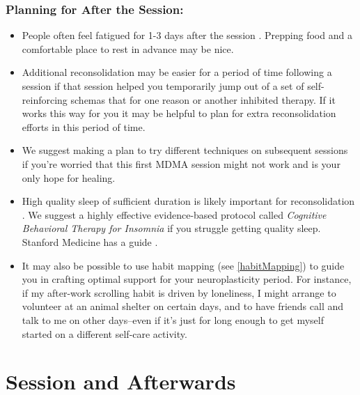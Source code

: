 \documentclass[12pt,letterpaper]{book}
\begin{document}
\subsection*{Planning for After the Session:}
\begin{itemize}
    \item People often feel fatigued for 1-3 days after the session \cite{liechtiGender}. Prepping food and a comfortable place to rest in advance may be nice.
    \item Additional reconsolidation may be easier for a period of time following a session if that session helped you temporarily jump out of a set of self-reinforcing schemas that for one reason or another inhibited therapy. If it works this way for you it may be helpful to plan for extra reconsolidation efforts in this period of time.
    \item We suggest making a plan to try different techniques on subsequent sessions if you're worried that this first MDMA session might not work and is your only hope for healing.
    \item High quality sleep of sufficient duration is likely important for reconsolidation \cite{simon2020sleep}. We suggest a highly effective evidence-based protocol called \textit{Cognitive Behavioral Therapy for Insomnia} if you struggle getting quality sleep. Stanford Medicine has a guide \cite{stanfordSleep}.
    \item {} It may also be possible to use habit mapping (see \ref{habitMapping}) to guide you in crafting optimal support for your neuroplasticity period. For instance, if my after-work scrolling habit is driven by loneliness, I might arrange to volunteer at an animal shelter on certain days, and to have friends call and talk to me on other days–even if it's just for long enough to get myself started on a different self-care activity.
\end{itemize}
\chapter{Session and Afterwards}
\end{document}
